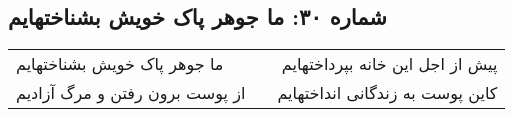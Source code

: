 \begin{center}
\section*{شماره ۳۰: ما جوهر پاک خویش بشناختهایم}
\label{sec:030}
\begin{longtable}{l p{0.5cm} r}
ما جوهر پاک خویش بشناختهایم
&&
پیش از اجل این خانه بپرداختهایم
\\
از پوست برون رفتن و مرگ آزادیم
&&
کاین پوست به زندگانی انداختهایم
\\
\end{longtable}
\end{center}
